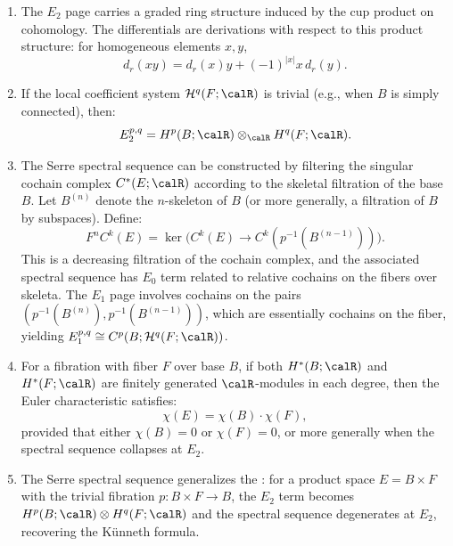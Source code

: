 \begin{definition}
\begin{enumerate}
    \item The $E_2$ page carries a graded ring structure induced by the cup product on cohomology. The differentials are derivations with respect to this product structure: for homogeneous elements $x, y$,
    $$ d_r(xy) = d_r(x)y + (-1)^{|x|} x\,d_r(y). $$

    \item If the local coefficient system $\mathcal{H}^q(F; \calR)$ is trivial (e.g., when $B$ is simply connected), then:
    $$ E_2^{p,q} = H^p(B; \calR) \otimes_\calR H^q(F; \calR). $$

    \item The Serre spectral sequence can be constructed by filtering the singular cochain complex $C^*(E; \calR)$ according to the skeletal filtration of the base $B$. Let $B^{(n)}$ denote the $n$-skeleton of $B$ (or more generally, a filtration of $B$ by subspaces). Define:
    $$ F^n C^k(E) = \ker\bigl(C^k(E) \to C^k(p^{-1}(B^{(n-1)}))\bigr). $$
    This is a decreasing filtration of the cochain complex, and the associated spectral sequence has $E_0$ term related to relative cochains on the fibers over skeleta. The $E_1$ page involves cochains on the pairs $(p^{-1}(B^{(n)}), p^{-1}(B^{(n-1)}))$, which are essentially cochains on the fiber, yielding $E_1^{p,q} \cong C^p(B; \mathcal{H}^q(F; \calR))$.

    \item For a fibration with fiber $F$ over base $B$, if both $H^*(B; \calR)$ and $H^*(F; \calR)$ are finitely generated $\calR$-modules in each degree, then the Euler characteristic satisfies:
    $$ \chi(E) = \chi(B) \cdot \chi(F), $$
    provided that either $\chi(B) = 0$ or $\chi(F) = 0$, or more generally when the spectral sequence collapses at $E_2$.

    \item The Serre spectral sequence generalizes the : for a product space $E = B \times F$ with the trivial fibration $p: B \times F \to B$, the $E_2$ term becomes $H^p(B; \calR) \otimes H^q(F; \calR)$ and the spectral sequence degenerates at $E_2$, recovering the Künneth formula.
\end{enumerate}

\end{definition}
